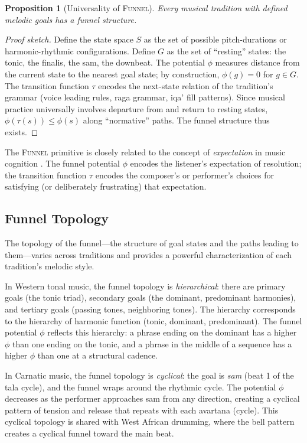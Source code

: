 \documentclass[cmj]{article}
\newtheorem{proposition}{Proposition}
\newcommand{\FUNNEL}{\textsc{Funnel}}
\begin{document}
\begin{proposition}[Universality of \FUNNEL{}]
Every musical tradition with defined melodic goals has a funnel structure.
\end{proposition}

\begin{proof}[Proof sketch]
Define the state space $S$ as the set of possible pitch-durations or
harmonic-rhythmic configurations. Define $G$ as the set of ``resting''
states: the tonic, the finalis, the sam, the downbeat. The potential $\phi$
measures distance from the current state to the nearest goal state; by
construction, $\phi(g) = 0$ for $g \in G$. The transition function $\tau$
encodes the next-state relation of the tradition's grammar (voice leading
rules, raga grammar, iqa' fill patterns). Since musical practice universally
involves departure from and return to resting states, $\phi(\tau(s)) \leq
\phi(s)$ along ``normative'' paths. The funnel structure thus exists.
\end{proof}

The \FUNNEL{} primitive is closely related to the concept of
\emph{expectation} in music cognition \citep{meyer1956emotion,huron2006sweet}.
The funnel potential $\phi$ encodes the listener's expectation of resolution;
the transition function $\tau$ encodes the composer's or performer's
choices for satisfying (or deliberately frustrating) that expectation.

\subsection{Funnel Topology}

The topology of the funnel---the structure of goal states and the paths
leading to them---varies across traditions and provides a powerful
characterization of each tradition's melodic style.

In Western tonal music, the funnel topology is \emph{hierarchical}: there are
primary goals (the tonic triad), secondary goals (the dominant, predominant
harmonies), and tertiary goals (passing tones, neighboring tones). The
hierarchy corresponds to the hierarchy of harmonic function (tonic, dominant,
predominant). The funnel potential $\phi$ reflects this hierarchy: a phrase
ending on the dominant has a higher $\phi$ than one ending on the tonic, and a
phrase in the middle of a sequence has a higher $\phi$ than one at a
structural cadence.

In Carnatic music, the funnel topology is \emph{cyclical}: the goal is
\emph{sam} (beat 1 of the tala cycle), and the funnel wraps around the
rhythmic cycle. The potential $\phi$ decreases as the performer approaches
sam from any direction, creating a cyclical pattern of tension and release
that repeats with each avartana (cycle). This cyclical topology is shared with
West African drumming, where the bell pattern creates a cyclical funnel toward
the main beat.
\end{document}
